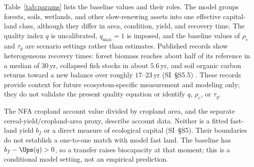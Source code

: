 Table~\ref{tab:params} lists the baseline values and their roles. The model groups forests, soils, wetlands, and other slow-renewing assets into one effective capital-land class, although they differ in area, condition, yield, and recovery time. The quality index $q$ is uncalibrated, $q_{\max}=1$ is imposed, and the baseline values of $\rho_c$ and $\tau_g$ are scenario settings rather than estimates. Published records show heterogeneous recovery times: forest biomass reaches about half of its reference in a median of $30$\,yr, collapsed fish stocks in about $5.6$\,yr, and soil organic carbon returns toward a new balance over roughly $17$--$23$\,yr (SI~\S S5.5) \citep{Poorter2016,HutchingsReynolds2004,Neubauer2013,Poeplau2011}. These records provide context for future ecosystem-specific measurement and modeling only; they do not validate the present quality equation or identify $q$, $\rho_c$, or $\tau_g$.

The NFA cropland account value divided by cropland area, and the separate cereal-yield/cropland-area proxy, describe account data. Neither is a fitted fast-land yield $b_f$ or a direct measure of ecological capital (SI~\S S5). Their boundaries do not establish a one-to-one match with model fast land. The baseline has $b_f-\Ups(q)>0$, so a transfer raises biocapacity at that moment; this is a conditional model setting, not an empirical prediction.


